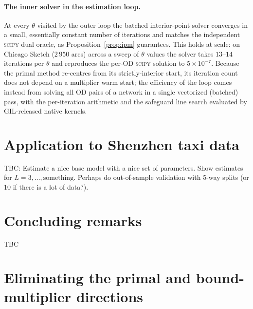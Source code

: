 \documentclass[12pt]{article}
\begin{document}
\paragraph{The inner solver in the estimation loop.} At every $\theta$ visited by
the outer loop the batched interior-point solver converges in a small, essentially
constant number of iterations and matches the independent \textsc{scipy} dual
oracle, as Proposition~\ref{prop:ipm} guarantees. This holds at scale: on Chicago
Sketch ($2\,950$ arcs) across a sweep of $\theta$ values the solver takes $13$--$14$
iterations per $\theta$ and reproduces the per-OD \textsc{scipy} solution to
$5\times10^{-7}$. Because the primal method re-centres from its strictly-interior
start, its iteration count does not depend on a multiplier warm start; the
efficiency of the loop comes instead from solving all OD pairs of a network in a
single vectorized (batched) pass, with the per-iteration arithmetic and the
safeguard line search evaluated by GIL-released native kernels.

\section{Application to Shenzhen taxi data}\label{sec:application}

TBC: Estimate a nice base model with  a nice set of parameters. Show estimates for $L=3,...,\text{something}$. Perhaps do out-of-sample validation with 5-way splits (or 10 if there is a lot of data?). 

\section{Concluding remarks}\label{sec:conclusion}

TBC

\appendix

\section{Eliminating the primal and bound-multiplier directions}
\label{app:ipm-elimination}
\end{document}
